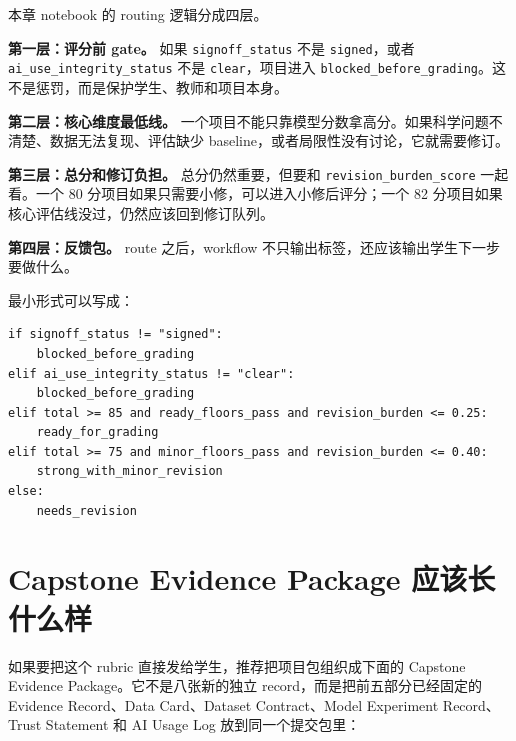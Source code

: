 本章 notebook 的 routing 逻辑分成四层。

\textbf{第一层：评分前 gate。} 如果 \texttt{signoff\_status} 不是 \texttt{signed}，或者 \texttt{ai\_use\_integrity\_status} 不是 \texttt{clear}，项目进入 \texttt{blocked\_before\_grading}。这不是惩罚，而是保护学生、教师和项目本身。

\textbf{第二层：核心维度最低线。} 一个项目不能只靠模型分数拿高分。如果科学问题不清楚、数据无法复现、评估缺少 baseline，或者局限性没有讨论，它就需要修订。

\textbf{第三层：总分和修订负担。} 总分仍然重要，但要和 \texttt{revision\_burden\_score} 一起看。一个 80 分项目如果只需要小修，可以进入小修后评分；一个 82 分项目如果核心评估线没过，仍然应该回到修订队列。

\textbf{第四层：反馈包。} route 之后，workflow 不只输出标签，还应该输出学生下一步要做什么。

最小形式可以写成：

\begin{examplebox}
\begin{lstlisting}[style=pythonstyle]
if signoff_status != "signed":
    blocked_before_grading
elif ai_use_integrity_status != "clear":
    blocked_before_grading
elif total >= 85 and ready_floors_pass and revision_burden <= 0.25:
    ready_for_grading
elif total >= 75 and minor_floors_pass and revision_burden <= 0.40:
    strong_with_minor_revision
else:
    needs_revision
\end{lstlisting}
\end{examplebox}

\section{Capstone Evidence Package 应该长什么样}

如果要把这个 rubric 直接发给学生，推荐把项目包组织成下面的 Capstone Evidence Package。它不是八张新的独立 record，而是把前五部分已经固定的 Evidence Record、Data Card、Dataset Contract、Model Experiment Record、Trust Statement 和 AI Usage Log 放到同一个提交包里：

